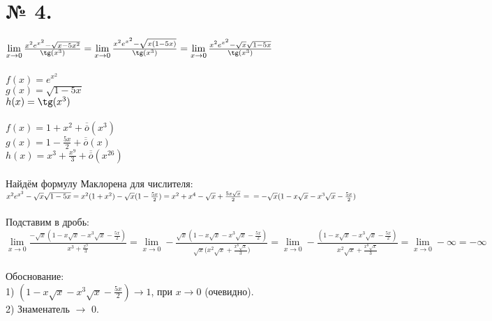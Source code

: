 \documentclass[a4paper, 12pt]{report}
\begin{document}
\section{№ 4.}
$\lim\limits_{x \to 0}\frac{x^2e^{x^2} - \sqrt{x - 5x^2}}{\tg(x^3)} = \lim\limits_{x \to 0}\frac{x^2e^{x^2} - \sqrt{x(1 - 5x)}}{\tg(x^3)} = 
\lim\limits_{x \to 0}\frac{x^2e^{x^2} - \sqrt{x}\sqrt{1 - 5x}}{\tg(x^3)}$\\
\\
$f(x) = e^{x^2}$\\
$g(x) = \sqrt{1 - 5x}$\\
$h(x) = \tg(x^3)$\\
\\
$f(x) = 1 + x^2 + \overline{\overline{o}}(x^3)$\\
$g(x) = 1 - \frac{5x}{2} + \overline{\overline{o}}(x)$\\
$h(x) = x^3 + \frac{x^9}{3} + \overline{\overline{o}}(x^{26})$\\
\\
Найдём формулу Маклорена для числителя:\\
$x^2e^{x^2} - \sqrt{x}\sqrt{1 - 5x} = x^2(1 + x^2) - \sqrt{x}(1 - \frac{5x}{2}) = x^2 + x^4 - \sqrt{x} + \frac{5x\sqrt{x}}{2} =\\
= -\sqrt{x}(1 - x\sqrt{x} - x^3\sqrt{x} - \frac{5x}{2})$
\\
\\
Подставим в дробь:\\
$\lim\limits_{x \to 0}\frac{-\sqrt{x}(1 - x\sqrt{x} - x^3\sqrt{x} - \frac{5x}{2})}{x^3 + \frac{x^9}{3}} = 
\lim\limits_{x \to 0}-\frac{\sqrt{x}(1 - x\sqrt{x} - x^3\sqrt{x} - \frac{5x}{2})}{\sqrt{x}({x^2\sqrt{x} + \frac{x^8\sqrt{x}}{3})}} = 
\lim\limits_{x \to 0}-\frac{(1 - x\sqrt{x} - x^3\sqrt{x} - \frac{5x}{2})}{{x^2\sqrt{x} + \frac{x^8\sqrt{x}}{3}}} = 
\lim\limits_{x \to 0}-\infty = -\infty$\\
\\
Обоснование:\\
1) $(1 - x\sqrt{x} - x^3\sqrt{x} - \frac{5x}{2}) \to 1$, при $x \to 0$ (очевидно).\\
2) Знаменатель $\to$ 0.\\
\end{document}
